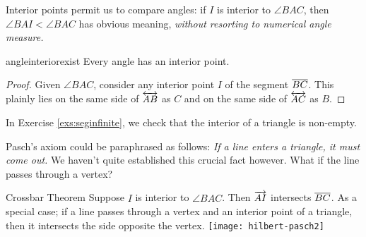 Interior points permit us to compare angles: if $I$ is interior to $\angle BAC$, then $\angle BAI<\angle BAC$ has obvious meaning, \emph{without resorting to numerical angle measure.}

\begin{cor}{}{angleinteriorexist}
Every angle has an interior point.
\end{cor}

\begin{proof}
Given $\angle BAC$, consider any interior point $I$ of the segment $\overline{BC}$. This plainly lies on the same side of $\overleftrightarrow{AB}$ as $C$ and on the same side of $\overleftrightarrow{AC}$ as $B$.
\end{proof}

In Exercise \ref{exs:seginfinite}, we check that the interior of a triangle is non-empty.

\goodbreak

Pasch's axiom could be paraphrased as follows: \emph{If a line enters a triangle, it must come out.} We haven't quite established this crucial fact however. What if the line passes through a vertex?
 
\begin{thm}[lower separated=false, sidebyside, sidebyside align=top seam, sidebyside gap=0pt, righthand width=0.3\linewidth]{Crossbar Theorem}{}
Suppose $I$ is interior to $\angle BAC$. Then $\overrightarrow{AI}$ intersects $\overline{BC}$.\medbreak
As a special case; if a line passes through a vertex and an interior point of a triangle, then it intersects the side opposite the vertex.
\tcblower
\flushright\texttt{[image: hilbert-pasch2]}
\end{thm}


